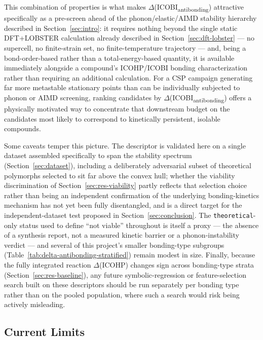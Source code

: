 \documentclass[journal=jpccck,manuscript=article]{achemso}
\begin{document}
This combination of properties is what makes
$\Delta$(ICOBI\textsubscript{antibonding}) attractive specifically as a
pre-screen ahead of the phonon/elastic/AIMD stability hierarchy described in
Section~\ref{sec:intro}: it requires nothing beyond the single static
DFT+LOBSTER calculation already described in
Section~\ref{sec:dft-lobster} --- no supercell, no finite-strain set, no
finite-temperature trajectory --- and, being a bond-order-based rather than
a total-energy-based quantity, it is available immediately alongside a
compound's ICOHP/ICOBI bonding characterization rather than requiring an
additional calculation. For a CSP campaign generating far more metastable
stationary points than can be individually subjected to phonon or AIMD
screening, ranking candidates by $\Delta$(ICOBI\textsubscript{antibonding})
offers a physically motivated way to concentrate that downstream budget on
the candidates most likely to correspond to kinetically persistent,
isolable compounds.

Some caveats temper this picture. The descriptor is validated here on a
single dataset assembled specifically to span the stability spectrum
(Section~\ref{sec:dataset}), including a deliberately adversarial subset of
theoretical polymorphs selected to sit far above the convex hull; whether
the viability discrimination of Section~\ref{sec:res-viability} partly
reflects that selection choice rather than being an independent confirmation
of the underlying bonding-kinetics mechanism has not yet been fully
disentangled, and is a direct target for the independent-dataset test
proposed in Section~\ref{sec:conclusion}. The \texttt{theoretical}-only
status used to define ``not viable'' throughout is itself a proxy --- the
absence of a synthesis report, not a measured kinetic barrier or a
phonon-instability verdict --- and several of this project's smaller
bonding-type subgroups (Table~\ref{tab:delta-antibonding-stratified})
remain modest in size. Finally, because the fully integrated reaction
$\Delta$(ICOHP) changes sign across bonding-type strata
(Section~\ref{sec:res-baseline}), any future symbolic-regression or
feature-selection search built on these descriptors should be run separately
per bonding type rather than on the pooled population, where such a search
would risk being actively misleading.

\subsection{Current Limits}
\label{sec:limits}
\end{document}
